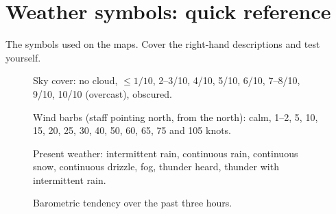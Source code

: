 \section{Weather symbols: quick reference}\label{p3-app:symbols}

The symbols used on the maps. Cover the right-hand descriptions and test yourself.

\begin{figure}[ht]
\centering
\begin{tikzpicture}[x=0.052cm,y=-0.052cm,line cap=round]\end{tikzpicture}
\caption{Sky cover: no cloud, $\le1/10$, 2--3/10, 4/10, 5/10, 6/10, 7--8/10, 9/10, 10/10 (overcast), obscured.}
\end{figure}

\begin{figure}[ht]
\centering
\begin{tikzpicture}[x=0.056cm,y=-0.056cm,line cap=round]\end{tikzpicture}
\caption{Wind barbs (staff pointing north, from the north): calm, 1--2, 5, 10, 15, 20, 25, 30, 40, 50, 60, 65, 75 and 105 knots.}
\end{figure}

\begin{figure}[ht]
\centering
\begin{tikzpicture}[x=0.052cm,y=-0.052cm,line cap=round]\end{tikzpicture}
\caption{Present weather: intermittent rain, continuous rain, continuous snow, continuous drizzle, fog, thunder heard, thunder with intermittent rain.}
\end{figure}

\begin{figure}[ht]
\centering
\begin{tikzpicture}[x=0.048cm,y=-0.048cm,line cap=round]\end{tikzpicture}
\caption{Barometric tendency over the past three hours.}
\end{figure}
